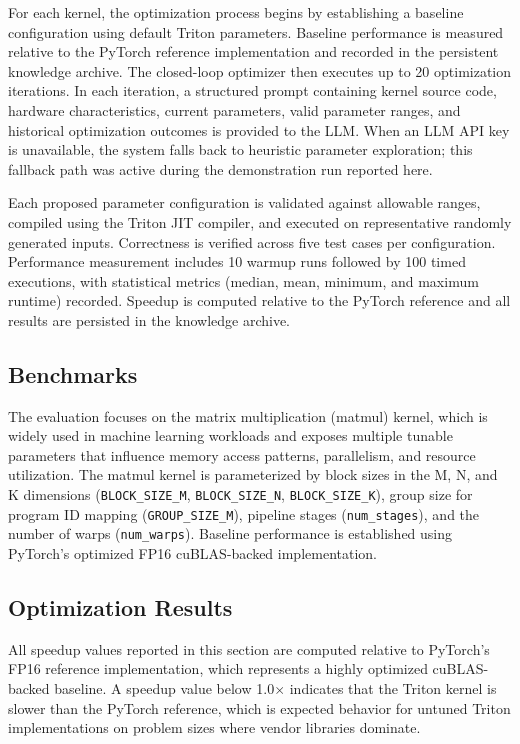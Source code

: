 \documentclass{article}
\begin{document}
For each kernel, the optimization process begins by establishing a baseline configuration using default Triton parameters. Baseline performance is measured relative to the PyTorch reference implementation and recorded in the persistent knowledge archive. The closed-loop optimizer then executes up to 20 optimization iterations. In each iteration, a structured prompt containing kernel source code, hardware characteristics, current parameters, valid parameter ranges, and historical optimization outcomes is provided to the LLM. When an LLM API key is unavailable, the system falls back to heuristic parameter exploration; this fallback path was active during the demonstration run reported here.

Each proposed parameter configuration is validated against allowable ranges, compiled using the Triton JIT compiler, and executed on representative randomly generated inputs. Correctness is verified across five test cases per configuration. Performance measurement includes 10 warmup runs followed by 100 timed executions, with statistical metrics (median, mean, minimum, and maximum runtime) recorded. Speedup is computed relative to the PyTorch reference and all results are persisted in the knowledge archive.

\subsection{Benchmarks}

The evaluation focuses on the matrix multiplication (matmul) kernel, which is widely used in machine learning workloads and exposes multiple tunable parameters that influence memory access patterns, parallelism, and resource utilization. The matmul kernel is parameterized by block sizes in the M, N, and K dimensions (\texttt{BLOCK\_SIZE\_M}, \texttt{BLOCK\_SIZE\_N}, \texttt{BLOCK\_SIZE\_K}), group size for program ID mapping (\texttt{GROUP\_SIZE\_M}), pipeline stages (\texttt{num\_stages}), and the number of warps (\texttt{num\_warps}). Baseline performance is established using PyTorch's optimized FP16 cuBLAS-backed implementation.

\subsection{Optimization Results}

All speedup values reported in this section are computed relative to PyTorch's FP16 reference implementation, which represents a highly optimized cuBLAS-backed baseline. A speedup value below 1.0$\times$ indicates that the Triton kernel is slower than the PyTorch reference, which is expected behavior for untuned Triton implementations on problem sizes where vendor libraries dominate.\newline
\end{document}
